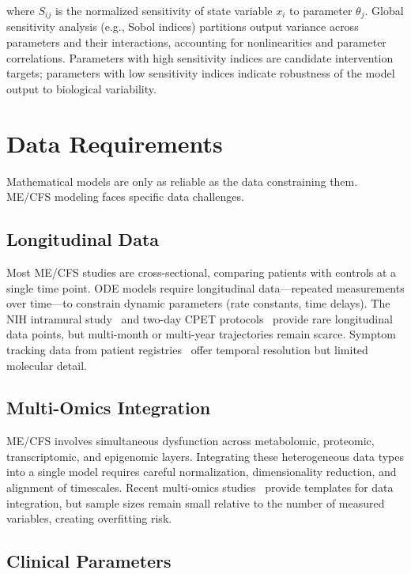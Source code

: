 where $S_{ij}$ is the normalized sensitivity of state variable $x_i$ to parameter $\theta_j$. Global sensitivity analysis (e.g., Sobol indices) partitions output variance across parameters and their interactions, accounting for nonlinearities and parameter correlations. Parameters with high sensitivity indices are candidate intervention targets; parameters with low sensitivity indices indicate robustness of the model output to biological variability.

\section{Data Requirements}
\label{sec:data-requirements}

Mathematical models are only as reliable as the data constraining them. ME/CFS modeling faces specific data challenges.

\subsection{Longitudinal Data}

Most ME/CFS studies are cross-sectional, comparing patients with controls at a single time point. ODE models require longitudinal data---repeated measurements over time---to constrain dynamic parameters (rate constants, time delays). The NIH intramural study~\cite{walitt2024deep} and two-day CPET protocols~\cite{keller2024cpet} provide rare longitudinal data points, but multi-month or multi-year trajectories remain scarce. Symptom tracking data from patient registries~\cite{jason2012energy} offer temporal resolution but limited molecular detail.

\subsection{Multi-Omics Integration}

ME/CFS involves simultaneous dysfunction across metabolomic, proteomic, transcriptomic, and epigenomic layers. Integrating these heterogeneous data types into a single model requires careful normalization, dimensionality reduction, and alignment of timescales. Recent multi-omics studies~\cite{Xiong2023multiomics,heng2025mecfs} provide templates for data integration, but sample sizes remain small relative to the number of measured variables, creating overfitting risk.

\subsection{Clinical Parameters}


